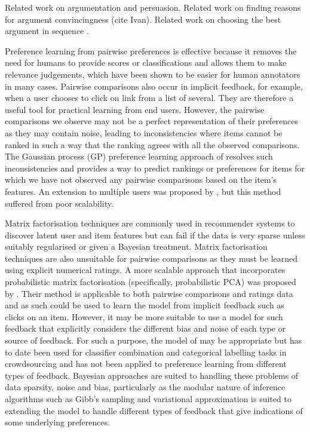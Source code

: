 Related work on argumentation and persuasion. Related work on finding reasons for argument convincingness (cite Ivan). Related work on choosing the best argument in sequence \cite{rosenfeld2016providing}\cite{monteserin2013reinforcement}. 

Preference learning from pairwise preferences is effective because it removes the need for humans to provide scores or classifications and allows them to make relevance judgements,
which have been shown to be easier for human annotators in many cases\cite{brochu_active_2007}. Pairwise comparisons also occur in implicit feedback, for example, when a user chooses to click on link from a list of several. They are therefore a useful tool for practical learning from end users. 
However, the pairwise comparisons we observe may not be a perfect representation of their preferences as they may contain noise, leading to inconsistencies where items cannot be ranked in such a way that the ranking agrees with all the observed comparisons. 
The Gaussian process (GP) preference learning approach of \cite{chu_preference_2005} resolves such inconsistencies and provides a way to predict rankings or preferences for 
items for which we have not observed any pairwise comparisons based on the item's features. 
An extension to multiple users was proposed by \cite{houlsby2012collaborative}, 
but this method suffered from poor scalability.

Matrix factorisation techniques are commonly used in recommender systems to discover latent
user and item features but can fail if the
data is very sparse unless suitably regularised or given a Bayesian treatment.
Matrix factorisation techniques are also unsuitable for pairwise comparisons as they 
must be learned using explicit numerical ratings.
A more scalable approach that incorporates probabilistic matrix factorisation
(specifically, probabilistic PCA) was proposed by \cite{khan2014scalable}.
Their method is applicable to both pairwise comparisons and ratings data
and as such could be used to learn the model from implicit feedback such as clicks on an item. However, it may be more suitable to use a model for such feedback that explicitly considers the different bias and noise of each type or source of feedback. For such
a purpose, the model of \cite{dawid_maximum_1979} may be appropriate but has to date
been used for classifier combination and categorical labelling tasks in crowdsourcing and has not been applied to preference learning from different types of feedback. 
Bayesian approaches are suited to handling these problems of data sparsity, noise and bias, 
particularly as the modular nature of inference algorithms such as Gibb's sampling and variational approximation is suited to extending the model to handle different types of feedback that give indications of some underlying preferences. 

